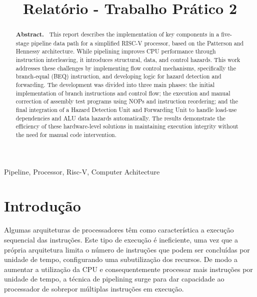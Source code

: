 \documentclass{sbc2023}%
\title[Presenting the JBCS template]{Relatório - Trabalho Prático 2}
\author[Viterbo et al. 202X]{
\affil{\textbf{Antônio Drumond Cota de Souza}}

\affil{\textbf{Davi Ferreira Puddo}}

\affil{\textbf{Gabriel Valedo Batista Silva}}

\affil{\textbf{Mateus Henrique Medeiros Diniz}}

\affil{\textbf{Raquel de Parde Motta}}
}
\begin{document}
\begin{frontmatter}
\maketitle

\begin{abstract}
\textbf{Abstract.~}
\noindent This report describes the implementation of key components in a five-stage pipeline data path for a simplified RISC-V processor, based on the Patterson and Hennessy architecture. While pipelining improves CPU performance through instruction interleaving, it introduces structural, data, and control hazards. This work addresses these challenges by implementing flow control mechanisms, specifically the branch-equal (BEQ) instruction, and developing logic for hazard detection and forwarding. The development was divided into three main phases: the initial implementation of branch instructions and control flow; the execution and manual correction of assembly test programs using NOPs and instruction reordering; and the final integration of a Hazard Detection Unit and Forwarding Unit to handle load-use dependencies and ALU data hazards automatically. The results demonstrate the efficiency of these hardware-level solutions in maintaining execution integrity without the need for manual code intervention. 
\end{abstract}

\begin{keywords}
Pipeline, Processor, Risc-V, Computer Achitecture
\end{keywords}


\end{frontmatter}


\section{Introdução}
\label{sec:intro}

Algumas arquiteturas de processadores têm como característica a execução sequencial das instruções. Este tipo de execução é ineficiente, uma vez que a própria arquitetura limita o número de instruções que podem ser concluídas por unidade de tempo, configurando uma subutilização dos recursos. De modo a aumentar a utilização da CPU e consequentemente processar mais instruções por unidade de tempo, a técnica de pipelining surge para dar capacidade ao processador de sobrepor múltiplas instruções em execução.
\end{document}
